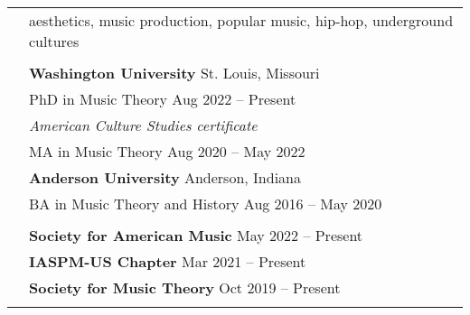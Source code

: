 \documentclass[letterpaper, 11pt]{article}
\begin{document}
\begin{longtable}{p{1.3in}p{4.8in}}

\nohyphens{\color{OliveGreen}{Research interests}}
& aesthetics, music production, popular music, hip-hop, underground cultures \\
& \\

\color{OliveGreen}{Education} 
& \textbf{Washington University} \hfill St. Louis, Missouri \\
& PhD in Music Theory \hfill Aug 2022 -- Present \\
& \textit{American Culture Studies certificate} \\
& MA in Music Theory \hfill Aug 2020 -- May 2022\\

& \textbf{Anderson University} \hfill Anderson, Indiana \\
& BA in Music Theory and History \hfill Aug 2016 -- May 2020 \\
&\\

{\color{OliveGreen}{Memberships}} 
& \textbf{Society for American Music} \hfill May 2022 -- Present \\
& \textbf{IASPM-US Chapter} \hfill Mar 2021 -- Present \\
& \textbf{Society for Music Theory} \hfill Oct 2019 -- Present \\
& \\



\end{longtable}
\end{document}
